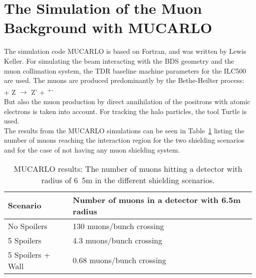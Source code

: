 \section{The Simulation of the Muon Background with MUCARLO}
\label{MUCARLO}

The simulation code MUCARLO is based on Fortran, and was written by Lewis Keller.
For simulating the beam interacting with the BDS geometry and the muon collimation system, the TDR baseline machine parameters for the ILC500 are used.
The muons are produced predominantly by the Bethe-Heilter process:\\
\textgamma + Z $\rightarrow$ Z' + \textmu\textsuperscript{+}\textmu\textsuperscript{-}\\
But also the muon production by direct annihilation of the positrons with atomic electrons is taken into account.
For tracking the halo particles, the tool Turtle is used.\\
The results from the MUCARLO simulations can be seen in Table~\ref{tab:MuonRates} listing the number of muons reaching the interaction region for the two shielding scenarios and for the case of not having any muon shielding system.

\begin{table}
\caption{MUCARLO results: The number of muons hitting a detector with radius of \unit{6.5}{m} in the different shielding scenarios.}
\label{tab:MuonRates}
\centering
\begin{tabularx}{\textwidth}{ll}
\hline\hline
\textbf{Scenario} & \textbf{Number of muons in a detector with 6.5m radius}\\
\hline
\cline{1-2}
\hline
 No Spoilers & 130 muons/bunch crossing\\
 5 Spoilers& 4.3 muons/bunch crossing\\
 5 Spoilers + Wall & 0.68 muons/bunch crossing\\
\hline\hline
\end{tabularx}
\end{table}